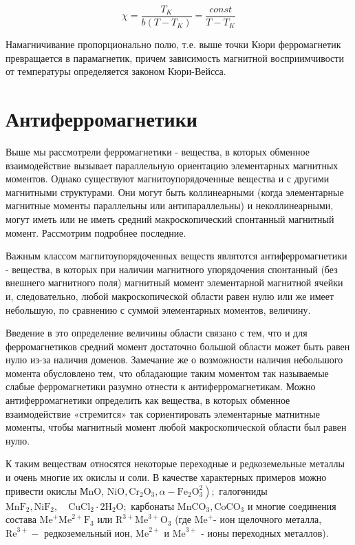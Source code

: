 \documentclass[a4paper,14pt]{article} %
\begin{document}
\[\chi = \frac{T_K}{b(T - T_K)} = \frac{const}{T-T_K}\]

Намагничивание пропорционально полю, т.е. выше точки Кюри ферромагнетик превращается в парамагнетик, причем зависимость магнитной восприимчивости от температуры определяется законом Кюри-Вейсса.



\section{Антиферромагнетики}

Выше мы рассмотрели ферромагнетики - вещества, в которых обменное взаимодействие вызывает параллельную ориентацию элементарных магнитных моментов. Однако существуют магнитоупорядоченные вещества и с другими магнитными структурами. Они могут быть коллинеарными (когда элементарные магнитные моменты параллельны или антипараллельны) и неколлинеарными, могут иметь или не иметь средний макроскопический спонтанный магнитный момент. Рассмотрим подробнее последние.

Важным классом магпитоупорядоченных веществ являтотся антиферромагнетики - вещества, в которых при наличии магнитного упорядочения спонтанный (без внешнего магнитного поля) магнитный момент элементарной магнитной ячейки и, следовательно, любой макроскопической области равен нулю или же имеет небольшую, по сравнению с суммой элементарных моментов, величину. 

Введение в это определение величины области связано с тем, что и для ферромагнетиков средний момент достаточно большой области может быть равен нулю из-за наличия доменов. Замечание же о возможности наличия небольшого момента обусловлено тем, что обладающие таким моментом так называемые слабые ферромагнетики разумно отнести к антиферромагнетикам. Можно антиферромагнетики определить как вещества, в которых обменное взаимодействие «стремится» так сориентировать элементарные матнитные моменты, чтобы магнитный момент любой макроскопической области был равен нулю.

К таким веществам относятся некоторые переходные и редкоземельные металлы и очень многие их окислы и соли. В качестве характерных примеров можно привести окислы МnO, $\left.\mathrm{NiO}, \mathrm{Cr}_{2} \mathrm{O}_{3}, \alpha-\mathrm{Fe}_{2} \mathrm{O}_{3}^{2}\right) ;$ галогөниды $\mathrm{MnF}_{2}, \mathrm{NiF}_{2}, \quad \mathrm{CuCl}_{2} \cdot 2 \mathrm{H}_{2} \mathrm{O} ;$ карбонаты $\mathrm{MnCO}_{3}, \mathrm{CoCO}_{3}$ и многие соединения состава $\mathrm{Me}^{+} \mathrm{Me}^{2+} \mathrm{F}_{3}$ или $\mathrm{R}^{3+} \mathrm{Me}^{3+} \mathrm{O}_{3}$ (где $\mathrm{Me}^{+}$- ион щелочного металла, $\mathrm{Re}^{3+}-$ редкоземельный ион, $\mathrm{Me}^{2+}$ и $\mathrm{Me}^{3+}$ - ионы переходных металлов).
\end{document}
